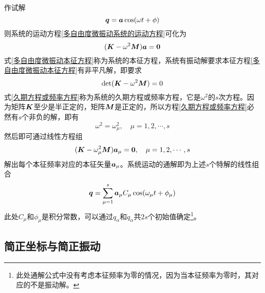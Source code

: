 作试解
\begin{equation*}
	\boldsymbol{q} = \boldsymbol{a} \cos (\omega t+\phi)
\end{equation*}
则系统的运动方程\eqref{多自由度微振动系统的运动方程}可化为
\begin{equation}
	(\boldsymbol{K} - \omega^2 \boldsymbol{M})\boldsymbol{a} = \boldsymbol{0}
	\label{多自由度微振动本征方程}
\end{equation}
式\eqref{多自由度微振动本征方程}称为系统的{\heiti 本征方程}，系统有振动解要求本征方程\eqref{多自由度微振动本征方程}有非平凡解，即要求
\begin{equation}
	\det (\boldsymbol{K} - \omega^2 \boldsymbol{M}) = 0
	\label{久期方程或频率方程}
\end{equation}
式\eqref{久期方程或频率方程}称为系统的{\heiti 久期方程}或{\heiti 频率方程}，它是$\omega^2$的$s$次方程。因为矩阵$\boldsymbol{K}$至少是半正定的，矩阵$\boldsymbol{M}$是正定的，所以方程\eqref{久期方程或频率方程}必然有$s$个非负的解，即有
\begin{equation*}
	\omega^2 = \omega_\mu^2,\quad \mu = 1,2,\cdots,s
\end{equation*}
然后即可通过线性方程组
\begin{equation*}
	(\boldsymbol{K} - \omega_\mu^2 \boldsymbol{M}) \boldsymbol{a}_\mu = \boldsymbol{0},\quad \mu = 1,2,\cdots,s
\end{equation*}
解出每个本征频率对应的本征矢量$\boldsymbol{a}_\mu$。系统运动的通解即为上述$s$个特解的线性组合
\begin{equation}
	\boldsymbol{q} = \sum_{\mu=1}^s \boldsymbol{a}_\mu C_\mu \cos (\omega_\mu t + \phi_\mu)
	\label{多自由度微振动通解}
\end{equation}
此处$C_\mu$和$\phi_\mu$是积分常数，可以通过$q_\alpha$和$\dot{q}_\alpha$共$2s$个初始值确定\footnote{此处通解公式中没有考虑本征频率为零的情况，因为当本征频率为零时，其对应的不是振动解。}。

\subsection{简正坐标与简正振动}

